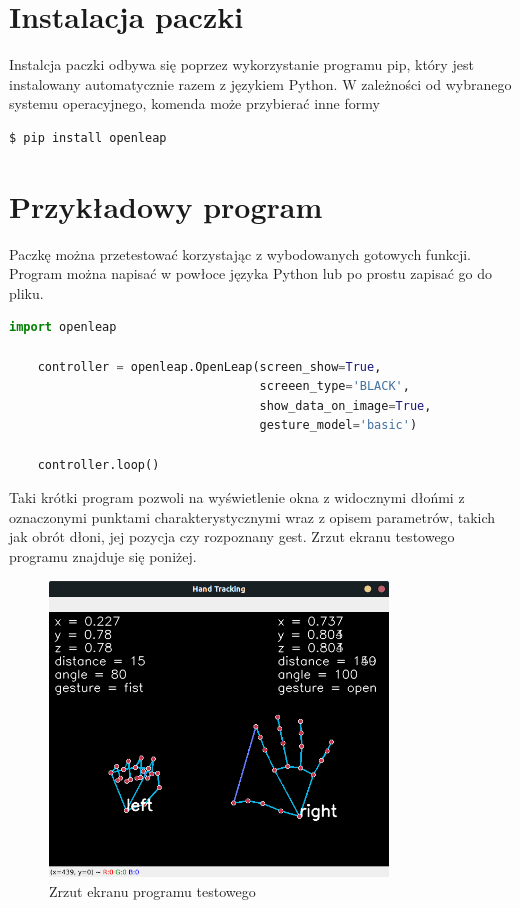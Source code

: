\section{Instalacja paczki}
\quad Instalcja paczki odbywa się poprzez wykorzystanie programu pip, który jest instalowany automatycznie razem z językiem Python. W zależności od wybranego systemu operacyjnego, komenda może przybierać inne formy 

\begin{lstlisting}[language=bash]
    $ pip install openleap
\end{lstlisting}

\section{Przykładowy program}

\quad Paczkę można przetestować korzystając z wybodowanych gotowych funkcji. Program można napisać w powłoce języka Python lub po prostu zapisać go do pliku. 

\begin{lstlisting}[language=python]
    import openleap

    controller = openleap.OpenLeap(screen_show=True, 
                                   screeen_type='BLACK', 
                                   show_data_on_image=True, 
                                   gesture_model='basic')
    
    controller.loop()
\end{lstlisting}

\quad Taki krótki program pozwoli na wyświetlenie okna z widocznymi dłońmi z oznaczonymi punktami charakterystycznymi wraz z opisem parametrów, takich jak obrót dłoni, jej pozycja czy rozpoznany gest. Zrzut ekranu testowego programu znajduje się poniżej. 

\begin{figure}[H]
    \begin{center}
        \includegraphics[width=9cm]{../images/example_program.png}
        \caption{Zrzut ekranu programu testowego}
    \end{center}
\end{figure}

